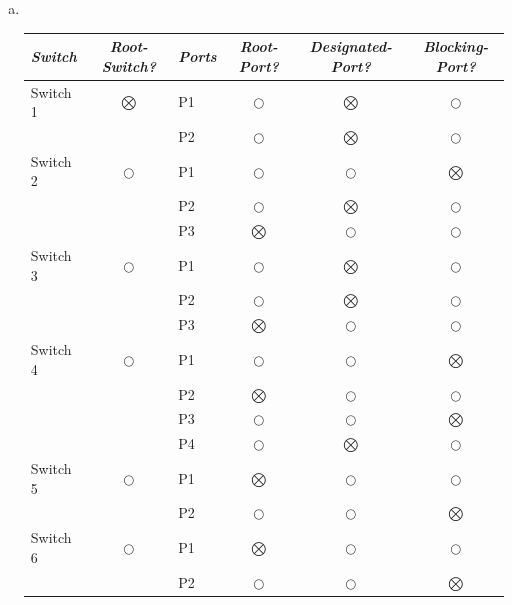 \begin{enumerate}[a)]
	\item {\hfill \\ \begin{tabular}{lclccc}
		\emph{Switch} & \emph{Root-Switch?} & \emph{Ports} & \emph{Root-Port?} & \emph{Designated-Port?} & \emph{Blocking-Port?} \\ \hline 
		Switch 1	  & $\bigotimes$        & P1           & $\bigcirc$        & $\bigotimes$            & $\bigcirc$            \\
					  &                     & P2           & $\bigcirc$        & $\bigotimes$            & $\bigcirc$            \\ \hline 
		Switch 2	  & $\bigcirc$          & P1           & $\bigcirc$        & $\bigcirc$              & $\bigotimes$          \\
			          &                     & P2           & $\bigcirc$        & $\bigotimes$            & $\bigcirc$            \\ 
					  &                     & P3           & $\bigotimes$      & $\bigcirc$              & $\bigcirc$            \\ \hline
		Switch 3	  & $\bigcirc$          & P1           & $\bigcirc$        & $\bigotimes$            & $\bigcirc$            \\
			          &                     & P2           & $\bigcirc$        & $\bigotimes$            & $\bigcirc$            \\ 
			          &                     & P3           & $\bigotimes$      & $\bigcirc$              & $\bigcirc$            \\ \hline
		Switch 4	  & $\bigcirc$          & P1           & $\bigcirc$        & $\bigcirc$              & $\bigotimes$          \\
			          &                     & P2           & $\bigotimes$      & $\bigcirc$              & $\bigcirc$            \\ 
			          &                     & P3           & $\bigcirc$        & $\bigcirc$              & $\bigotimes$          \\ 
			          &                     & P4           & $\bigcirc$        & $\bigotimes$            & $\bigcirc$            \\ \hline
		Switch 5	  & $\bigcirc$          & P1           & $\bigotimes$      & $\bigcirc$              & $\bigcirc$            \\
			          &                     & P2           & $\bigcirc$        & $\bigcirc$              & $\bigotimes$          \\ \hline
		Switch 6	  & $\bigcirc$          & P1           & $\bigotimes$      & $\bigcirc$              & $\bigcirc$            \\
			          &                     & P2           & $\bigcirc$        & $\bigcirc$              & $\bigotimes$          \\ \hline

	\end{tabular}}
	
\end{enumerate}

